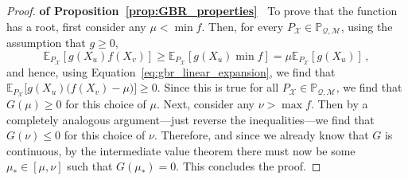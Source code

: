 \documentclass[3p]{elsarticle}
\newcommand{\states}{\mathcal{X}}
\newcommand{\rateset}{\mathcal{Q}}
\begin{document}
\begin{proof}{\bf of Proposition~\ref{prop:GBR_properties}~}
To prove that the function has a root, first consider any $\mu<\min f$. Then, for every $P_\states\in\mathbb{P}_{\rateset,\mathcal{M}}$, using the assumption that $g\geq 0$,
\begin{equation*}
\mathbb{E}_{P_\states}[g(X_u)f(X_v)] \geq \mathbb{E}_{P_\states}[g(X_u)\min f] = \mu\mathbb{E}_{P_\states}[g(X_u)]\,,
\end{equation*}
and hence, using Equation~\eqref{eq:gbr_linear_expansion}, we find that $\mathbb{E}_{P_\states}\bigl[g(X_u)\bigl(f(X_v)-\mu\bigr)\bigr] \geq 0$. Since this is true for all $P_\states\in \mathbb{P}_{\rateset,\mathcal{M}}$, we find that $G(\mu)\geq 0$ for this choice of $\mu$. Next, consider any $\nu>\max f$. Then by a completely analogous argument---just reverse the inequalities---we find that $G(\nu)\leq 0$ for this choice of $\nu$. Therefore, and since we already know that $G$ is continuous, by the intermediate value theorem there must now be some $\mu_*\in[\mu,\nu]$ such that $G(\mu_*)=0$. This concludes the proof.



\end{proof}
\end{document}
